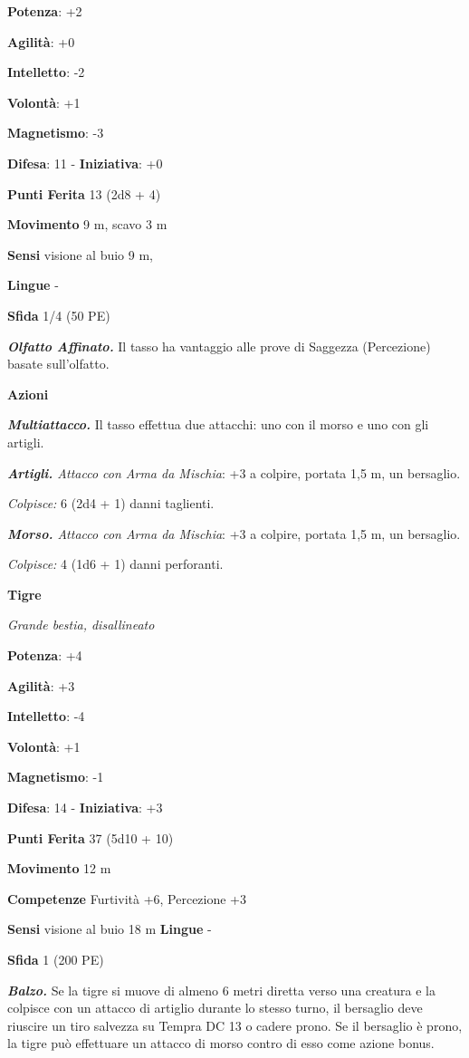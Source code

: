 \begin{multicols}{2}
\textbf{Potenza}: +2

\textbf{Agilità}: +0

\textbf{Intelletto}: -2

\textbf{Volontà}: +1

\textbf{Magnetismo}: -3

\textbf{Difesa}: 11 - \textbf{Iniziativa}: +0

\textbf{Punti Ferita} 13 (2d8 + 4)

\textbf{Movimento} 9 m, scavo 3 m

\textbf{Sensi} visione al buio 9 m, 

\textbf{Lingue} -

\textbf{Sfida} 1/4 (50 PE)

\emph{\textbf{Olfatto Affinato.}} Il tasso ha vantaggio alle prove di
Saggezza (Percezione) basate sull'olfatto.

\textbf{Azioni}

\emph{\textbf{Multiattacco.}} Il tasso effettua due attacchi: uno con il
morso e uno con gli artigli.

\emph{\textbf{Artigli.} Attacco con Arma da Mischia}: +3 a colpire,
portata 1,5 m, un bersaglio.

\emph{Colpisce:} 6 (2d4 + 1) danni taglienti.

\emph{\textbf{Morso.} Attacco con Arma da Mischia}: +3 a colpire,
portata 1,5 m, un bersaglio.

\emph{Colpisce:} 4 (1d6 + 1) danni perforanti.

\textbf{Tigre}

\emph{Grande bestia, disallineato}

\textbf{Potenza}: +4

\textbf{Agilità}: +3

\textbf{Intelletto}: -4

\textbf{Volontà}: +1

\textbf{Magnetismo}: -1

\textbf{Difesa}: 14 - \textbf{Iniziativa}: +3

\textbf{Punti Ferita} 37 (5d10 + 10)

\textbf{Movimento} 12 m

\textbf{Competenze} Furtività +6, Percezione +3

\textbf{Sensi} visione al buio 18 m
\textbf{Lingue} -

\textbf{Sfida} 1 (200 PE)

\emph{\textbf{Balzo.}} Se la tigre si muove di almeno 6 metri diretta
verso una creatura e la colpisce con un attacco di artiglio durante lo
stesso turno, il bersaglio deve riuscire un tiro salvezza su Tempra DC 13
o cadere prono. Se il bersaglio è prono, la tigre può effettuare un
attacco di morso contro di esso come azione bonus.


\end{multicols}
